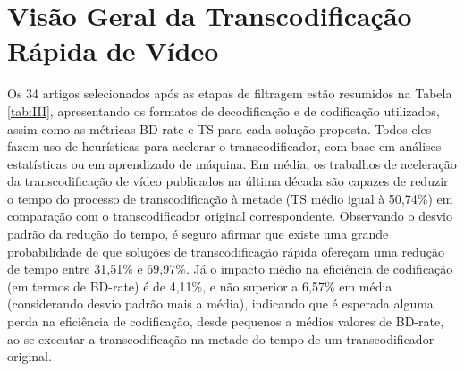\section{Visão Geral da Transcodificação Rápida de Vídeo}
\label{cap:3.1}

Os 34 artigos selecionados após as etapas de filtragem estão resumidos na Tabela \ref{tab:III}, apresentando os formatos de decodificação e de codificação utilizados, assim como as métricas BD-rate e TS para cada solução proposta. Todos eles fazem uso de heurísticas para acelerar o transcodificador, com base em análises estatísticas ou em aprendizado de máquina. Em média, os trabalhos de aceleração da transcodificação de vídeo publicados na última década são capazes de reduzir o tempo do processo de transcodificação à metade (TS médio igual à 50,74\%) em comparação com o transcodificador original correspondente. Observando o desvio padrão da redução do tempo, é seguro afirmar que existe uma grande probabilidade de que soluções de transcodificação rápida ofereçam uma redução de tempo entre 31,51\% e 69,97\%. Já o impacto médio na eficiência de codificação (em termos de BD-rate) é de 4,11\%, e não superior a 6,57\% em média (considerando desvio padrão mais a média), indicando que é esperada alguma perda na eficiência de codificação, desde pequenos a médios valores de BD-rate, ao se executar a transcodificação na metade do tempo de um transcodificador original.



